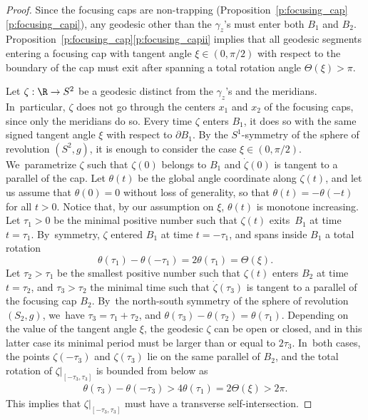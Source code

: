 \begin{proof}
Since the focusing caps are non-trapping (Proposition~\ref{p:focusing_cap}\eqref{p:focusing_capi}), any geodesic other than the $\gamma_z$'s must enter both $B_1$ and $B_2$. Proposition~\ref{p:focusing_cap}\eqref{p:focusing_capii} implies that all geodesic segments entering a focusing cap with tangent angle $\xi\in(0,\pi/2)$ with respect to the boundary of the cap must exit after spanning a total rotation angle $\Theta(\xi)>\pi$.

Let $\zeta:\R\to S^2$ be a geodesic distinct from the $\gamma_z$'s and the meridians. In~particular, $\zeta$ does not go through the centers $x_1$ and $x_2$ of the focusing caps, since only the meridians do so. Every time $\zeta$ enters $B_1$, it does so with the same signed tangent angle $\xi$ with respect to $\partial B_1$.
By the $S^1$-symmetry of the sphere of revolution $(S^2,g)$, it is enough to consider the case $\xi\in(0,\pi/2)$. We~parametrize $\zeta$ such that $\zeta(0)$ belongs to $B_1$ and $\dot\zeta(0)$ is tangent to a parallel of the cap. Let $\theta(t)$ be the global angle coordinate along $\zeta(t)$, and let us assume that $\theta(0)=0$ without loss of generality, so that $\theta(t)=-\theta(-t)$ for all $t>0$. Notice that, by our assumption on $\xi$, $\theta(t)$ is monotone increasing. Let $\tau_1>0$ be the minimal positive number such that $\zeta(t)$ exits~$B_1$ at time $t=\tau_1$. By~symmetry, $\zeta$ entered $B_1$ at time $t=-\tau_1$, and spans inside $B_1$ a total rotation
\[
\theta(\tau_1)-\theta(-\tau_1)=2\theta(\tau_1)=\Theta(\xi).
\]
Let $\tau_2>\tau_1$ be the smallest positive number such that $\zeta(t)$ enters $B_2$ at time $t=\tau_2$, and $\tau_3>\tau_2$ the minimal time such that $\dot\zeta(\tau_3)$ is tangent to a parallel of the focusing cap $B_2$. By~the north-south symmetry of the sphere of revolution $(S_2,g)$, we~have $\tau_3=\tau_1+\tau_2$, and $\theta(\tau_3)-\theta(\tau_2)=\theta(\tau_1)$. Depending on the value of the tangent angle $\xi$, the geodesic $\zeta$ can be open or closed, and in this latter case its minimal period must be larger than or equal to $2\tau_3$. In~both cases, the points $\zeta(-\tau_3)$ and $\zeta(\tau_3)$ lie on the same parallel of $B_2$, and the total rotation of $\zeta|_{[-\tau_3,\tau_3]}$ is bounded from below as
\begin{align*}
\theta(\tau_3)-\theta(-\tau_3)
>
4\theta(\tau_1)
=
2\Theta(\xi)
>2\pi.
\end{align*}
This implies that $\zeta|_{[-\tau_3,\tau_3]}$ must have a transverse self-intersection.
\end{proof}

